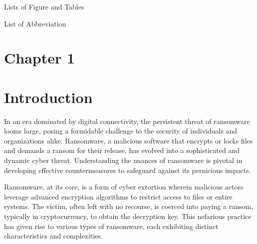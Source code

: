\documentclass[12pt,letterpaper]{article}
\begin{document}
\newpage
    \begin{center}
        \vspace*{1cm}
        
            \LARGE Lists of Figure and Tables
        
        \vspace{1.2cm}
        
    \end{center}


\newpage
    \begin{center}
        \vspace*{1cm}
        
            \LARGE List of Abbreviation
        
        \vspace{1.2cm}
        
    \end{center}


\newpage
    \begin{center}
            \tableofcontents
            \newpage
            \clearpage
    \end{center}

\newpage
\section*{Chapter 1}
\vspace*{1.2 cm}
    \section{Introduction}

    In an era dominated by digital connectivity, the persistent threat of ransomware looms large, posing a formidable challenge to the security of individuals and organizations alike. Ransomware, a malicious software that encrypts or locks files and demands a ransom for their release, has evolved into a sophisticated and dynamic cyber threat. Understanding the nuances of ransomware is pivotal in developing effective countermeasures to safeguard against its pernicious impacts.

    Ransomware, at its core, is a form of cyber extortion wherein malicious actors leverage advanced encryption algorithms to restrict access to files or entire systems. The victim, often left with no recourse, is coerced into paying a ransom, typically in cryptocurrency, to obtain the decryption key. This nefarious practice has given rise to various types of ransomware, each exhibiting distinct characteristics and complexities.
    
\end{document}
